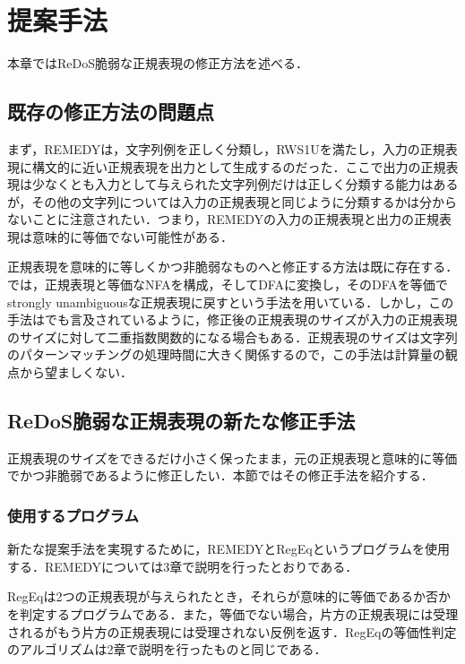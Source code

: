 \documentclass[a4paper, 12pt, dvipdfmx, uplatex]{jsreport}
\begin{document}
\chapter{提案手法}
本章ではReDoS脆弱な正規表現の修正方法を述べる．

\section{既存の修正方法の問題点}\label{issue}
まず，REMEDYは，文字列例を正しく分類し，RWS1Uを満たし，入力の正規表現に構文的に近い正規表現を出力として生成するのだった．ここで出力の正規表現は少なくとも入力として与えられた文字列例だけは正しく分類する能力はあるが，その他の文字列については入力の正規表現と同じように分類するかは分からないことに注意されたい．つまり，REMEDYの入力の正規表現と出力の正規表現は意味的に等価でない可能性がある．

正規表現を意味的に等しくかつ非脆弱なものへと修正する方法は既に存在する．\cite{harmless}では，正規表現と等価なNFAを構成，そしてDFAに変換し，そのDFAを等価でstrongly unambiguousな正規表現に戻すという手法を用いている．しかし，この手法は\cite{harmless}でも言及されているように，修正後の正規表現のサイズが入力の正規表現のサイズに対して二重指数関数的になる場合もある．正規表現のサイズは文字列のパターンマッチングの処理時間に大きく関係するので，この手法は計算量の観点から望ましくない．

\section{ReDoS脆弱な正規表現の新たな修正手法}
正規表現のサイズをできるだけ小さく保ったまま，元の正規表現と意味的に等価でかつ非脆弱であるように修正したい．本節ではその修正手法を紹介する．

\subsection{使用するプログラム}
新たな提案手法を実現するために，REMEDYとRegEq\cite{regeq}というプログラムを使用する．REMEDYについては3章で説明を行ったとおりである．


RegEqは2つの正規表現が与えられたとき，それらが意味的に等価であるか否かを判定するプログラムである．また，等価でない場合，片方の正規表現には受理されるがもう片方の正規表現には受理されない反例を返す．RegEqの等価性判定のアルゴリズムは2章で説明を行った\cite{hopcroft}ものと同じである．
\end{document}
